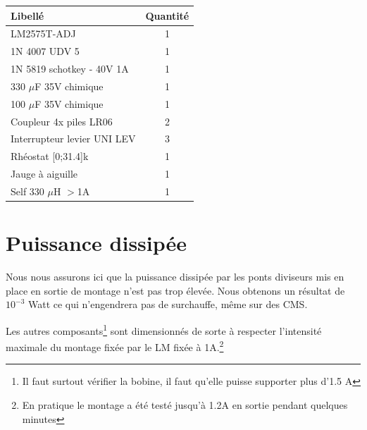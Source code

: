 \documentclass[12pt]{article}
\begin{document}
\begin{center}
	\begin{tabular}{|l|c|}
		\hline
		Libellé				& Quantité	\\ \hline
		LM2575T-ADJ			& 1		\\
		1N 4007 UDV 5			& 1		\\
		1N 5819 schotkey - 40V 1A	& 1		\\
		330 $\mu$F 35V chimique		& 1		\\
		100 $\mu$F 35V chimique		& 1		\\
		Coupleur 4x piles LR06		& 2		\\
		Interrupteur levier UNI LEV	& 3		\\
		Rhéostat [0;31.4]k\footnotemark	& 1		\\
		Jauge à aiguille		& 1		\\
		Self 330 $\mu$H $>$1A		& 1		\\
		\hline
	\end{tabular}
\end{center}



\section{Puissance dissipée}

Nous nous assurons ici que la puissance dissipée par les ponts diviseurs mis en place en sortie de montage n'est pas trop élevée.
Nous obtenons un résultat de $10^{-3}$ Watt ce qui n'engendrera pas de surchauffe, même sur des CMS.\newline

Les autres composants\footnote{Il faut surtout vérifier la bobine, il faut qu'elle puisse supporter plus d'1.5 A} sont 
dimensionnés de sorte à respecter l'intensité maximale du montage fixée par le LM fixée à 1A.\footnote{En pratique le montage
a été testé jusqu'à 1.2A en sortie pendant quelques minutes}
\end{document}
